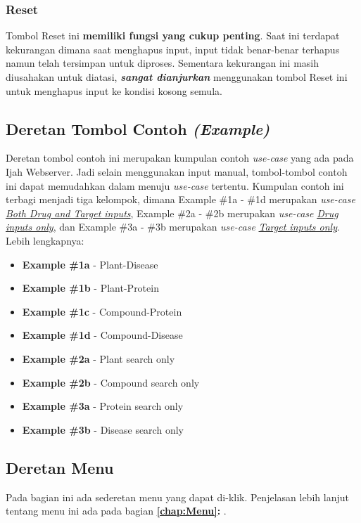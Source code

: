 		\subsubsection{Reset} \label{sssec:reset}
		Tombol Reset ini \textbf{memiliki fungsi yang cukup penting}. Saat ini terdapat kekurangan dimana saat menghapus input, input tidak benar-benar terhapus namun telah tersimpan untuk diproses. Sementara kekurangan ini masih diusahakan untuk diatasi, \textbf{\emph{sangat dianjurkan}} menggunakan tombol Reset ini untuk menghapus input ke kondisi kosong semula.

	\subsection{Deretan Tombol Contoh \emph{(Example)}} \label{ssec:example button}
	Deretan tombol contoh ini merupakan kumpulan contoh \emph{use-case} yang ada pada Ijah Webserver. Jadi selain menggunakan input manual, tombol-tombol contoh ini dapat memudahkan dalam menuju \emph{use-case} tertentu. Kumpulan contoh ini terbagi menjadi tiga kelompok, dimana Example \#1a - \#1d merupakan \emph{use-case} \hyperref[end to end]{\emph{Both Drug and Target inputs}}, Example \#2a - \#2b merupakan \emph{use-case} \hyperref[drug only]{\emph{Drug inputs only}}, dan Example \#3a - \#3b merupakan \emph{use-case} \hyperref[target only]{\emph{Target inputs only}}. Lebih lengkapnya:

	\begin{itemize}
	\item \textbf{Example \#1a} - Plant-Disease
	\item \textbf{Example \#1b} - Plant-Protein
	\item \textbf{Example \#1c} - Compound-Protein
	\item \textbf{Example \#1d} - Compound-Disease
	\item \textbf{Example \#2a} - Plant search only
	\item \textbf{Example \#2b} - Compound search only
	\item \textbf{Example \#3a} - Protein search only
	\item \textbf{Example \#3b} - Disease search only
	\end{itemize}

	\subsection{Deretan Menu} \label{ssec:menu list}
	Pada bagian ini ada sederetan menu yang dapat di-klik. Penjelasan lebih lanjut tentang menu ini ada pada bagian \textbf{\ref{chap:Menu}:} \textbf{}.

